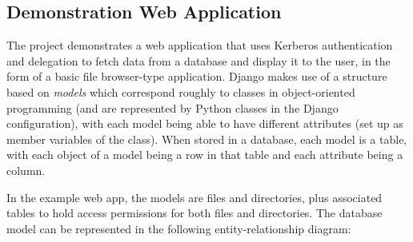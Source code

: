 \documentclass[12pt]{report}
\begin{document}
\subsection{Demonstration Web Application}
The project demonstrates a web application that uses Kerberos authentication and delegation to fetch data from a database and display it to the user, in the form of a basic file browser-type application. Django makes use of a structure based on \textit{models} which correspond roughly to classes in object-oriented programming (and are represented by Python classes in the Django configuration), with each model being able to have different attributes (set up as member variables of the class). When stored in a database, each model is a table, with each object of a model being a row in that table and each attribute being a column.

In the example web app, the models are files and directories, plus associated tables to hold access permissions for both files and directories. The database model can be represented in the following entity-relationship diagram:
\end{document}
